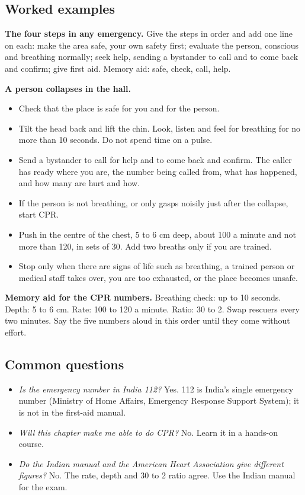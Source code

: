 \subsection*{Worked examples}

\textbf{The four steps in any emergency.} Give the steps in order and add one line on each: make the area safe, your own safety first; evaluate the person, conscious and breathing normally; seek help, sending a bystander to call and to come back and confirm; give first aid. Memory aid: safe, check, call, help.

\textbf{A person collapses in the hall.}
\begin{itemize}
\item Check that the place is safe for you and for the person.
\item Tilt the head back and lift the chin. Look, listen and feel for breathing for no more than 10 seconds. Do not spend time on a pulse.
\item Send a bystander to call for help and to come back and confirm. The caller has ready where you are, the number being called from, what has happened, and how many are hurt and how.
\item If the person is not breathing, or only gasps noisily just after the collapse, start CPR.
\item Push in the centre of the chest, 5 to 6 cm deep, about 100 a minute and not more than 120, in sets of 30. Add two breaths only if you are trained.
\item Stop only when there are signs of life such as breathing, a trained person or medical staff takes over, you are too exhausted, or the place becomes unsafe.
\end{itemize}

\textbf{Memory aid for the CPR numbers.} Breathing check: up to 10 seconds. Depth: 5 to 6 cm. Rate: 100 to 120 a minute. Ratio: 30 to 2. Swap rescuers every two minutes. Say the five numbers aloud in this order until they come without effort.

\subsection*{Common questions}

\begin{itemize}
\item \emph{Is the emergency number in India 112?} Yes. 112 is India's single emergency number (Ministry of Home Affairs, Emergency Response Support System); it is not in the first-aid manual.
\item \emph{Will this chapter make me able to do CPR?} No. Learn it in a hands-on course.
\item \emph{Do the Indian manual and the American Heart Association give different figures?} No. The rate, depth and 30 to 2 ratio agree. Use the Indian manual for the exam.
\end{itemize}

